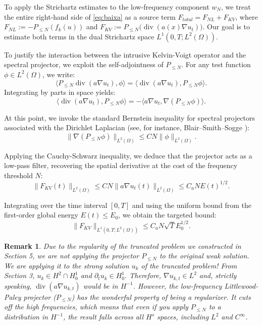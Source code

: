 \documentclass[11pt,letterpaper]{amsart}
\newtheorem{remark}[theorem]{Remark}
\begin{document}
To apply the Strichartz estimates to the low-frequency component $w_N$, we treat the entire right-hand side of \eqref{eq:baixa} as a source term $F_{total} = F_{NL} + F_{KV}$, where $F_{NL} := - P_{\le N}(f_k(u))$ and $F_{KV} := P_{\le N}\big( \operatorname{div}(a(x)\nabla u_t) \big)$. Our goal is to estimate both terms in the dual Strichartz space $L^1(0,T; L^2(\Omega))$.

To justify the interaction between the intrusive Kelvin-Voigt operator and the spectral projector, we exploit the self-adjointness of $P_{\le N}$. For any test function $\phi \in L^2(\Omega)$, we write:
\begin{equation}
\big\langle P_{\le N}\operatorname{div}(a\nabla u_t), \phi \big\rangle = \big\langle \operatorname{div}(a\nabla u_t), P_{\le N}\phi \big\rangle.
\end{equation}
Integrating by parts in space yields:
\begin{equation}
\big\langle \operatorname{div}(a\nabla u_t), P_{\le N}\phi \big\rangle = - \big\langle a\nabla u_t, \nabla (P_{\le N}\phi) \big\rangle.
\end{equation}

At this point, we invoke the standard Bernstein inequality for spectral projectors associated with the Dirichlet Laplacian (see, for instance, Blair--Smith--Sogge \cite{BlairSmithSogge2009}):
\begin{equation}
\|\nabla (P_{\le N}\phi)\|_{L^2(\Omega)} \le C N \|\phi\|_{L^2(\Omega)}.
\end{equation}

Applying the Cauchy-Schwarz inequality, we deduce that the projector acts as a low-pass filter, recovering the spatial derivative at the cost of the frequency threshold $N$:
\begin{equation}\label{LP-KV-lowfreq}
\| F_{KV}(t) \|_{L^2(\Omega)} \le C N \|a\nabla u_t(t)\|_{L^2(\Omega)} \le C_a N E(t)^{1/2}.
\end{equation}

Integrating over the time interval $[0,T]$ and using the uniform bound from the first-order global energy $E(t) \le E_0$, we obtain the targeted bound:
\begin{equation}\label{eq:est_FKV}
    \| F_{KV} \|_{L^1(0,T; L^2(\Omega))} \le C_a N \sqrt{T} E_0^{1/2}.
\end{equation}

\begin{remark}
Due to the regularity of the truncated problem we constructed in Section 5, we are not applying the projector $P_{\le N}$ to the original weak solution. We are applying it to the strong solution $u_k$ of the truncated problem! From Section 3, $u_k \in H^2 \cap H_0^1$ and $\partial_t u_k \in H_0^1$. Therefore, $\nabla u_{k,t} \in L^2$ and, strictly speaking, $\operatorname{div}(a\nabla u_{k,t})$ would be in $H^{-1}$. However, the low-frequency Littlewood-Paley projector ($P_{\le N}$) has the wonderful property of being a regularizer. It cuts off the high frequencies, which means that even if you apply $P_{\le N}$ to a distribution in $H^{-1}$, the result falls across all $H^s$ spaces, including $L^2$ and $C^\infty$.
\end{remark}
\end{document}
